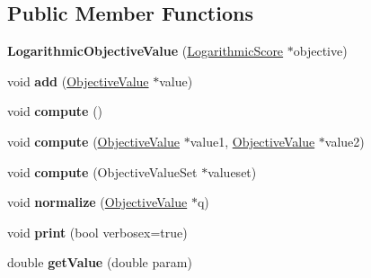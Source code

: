 \subsection*{Public Member Functions}
\begin{DoxyCompactItemize}
\item 
\hypertarget{classLogarithmicObjectiveValue_a5937a9820719eea4339488900bcb1cdb}{{\bfseries Logarithmic\-Objective\-Value} (\hyperlink{classLogarithmicScore}{Logarithmic\-Score} $\ast$objective)}\label{classLogarithmicObjectiveValue_a5937a9820719eea4339488900bcb1cdb}

\item 
\hypertarget{classLogarithmicObjectiveValue_a8b0696f17d27006b70695bdad8174fde}{void {\bfseries add} (\hyperlink{classObjectiveValue}{Objective\-Value} $\ast$value)}\label{classLogarithmicObjectiveValue_a8b0696f17d27006b70695bdad8174fde}

\item 
\hypertarget{classLogarithmicObjectiveValue_a8254a009057b71a9fa2b0aada5a3881c}{void {\bfseries compute} ()}\label{classLogarithmicObjectiveValue_a8254a009057b71a9fa2b0aada5a3881c}

\item 
\hypertarget{classLogarithmicObjectiveValue_a41a261b1cf9ae23bf833e0b6bdb7d555}{void {\bfseries compute} (\hyperlink{classObjectiveValue}{Objective\-Value} $\ast$value1, \hyperlink{classObjectiveValue}{Objective\-Value} $\ast$value2)}\label{classLogarithmicObjectiveValue_a41a261b1cf9ae23bf833e0b6bdb7d555}

\item 
\hypertarget{classLogarithmicObjectiveValue_a39f52d5d09a79e89202b1efe3054d6f3}{void {\bfseries compute} (Objective\-Value\-Set $\ast$valueset)}\label{classLogarithmicObjectiveValue_a39f52d5d09a79e89202b1efe3054d6f3}

\item 
\hypertarget{classLogarithmicObjectiveValue_a86c74627a9ac331a353c74b9a079f35a}{void {\bfseries normalize} (\hyperlink{classObjectiveValue}{Objective\-Value} $\ast$q)}\label{classLogarithmicObjectiveValue_a86c74627a9ac331a353c74b9a079f35a}

\item 
\hypertarget{classLogarithmicObjectiveValue_a0b07eb0a5ec7a61c60395e914aa3ba84}{void {\bfseries print} (bool verbosex=true)}\label{classLogarithmicObjectiveValue_a0b07eb0a5ec7a61c60395e914aa3ba84}

\item 
\hypertarget{classLogarithmicObjectiveValue_a0530e8fb37962ba4a3d9175aac6f6972}{double {\bfseries get\-Value} (double param)}\label{classLogarithmicObjectiveValue_a0530e8fb37962ba4a3d9175aac6f6972}

\end{DoxyCompactItemize}
